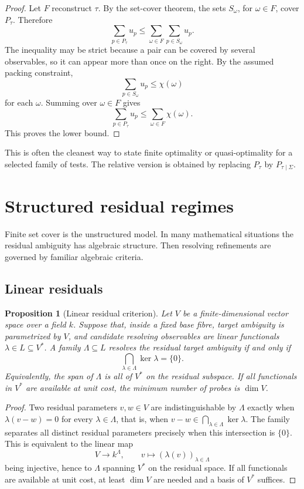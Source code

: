 \documentclass[11pt]{article}
\newtheorem{proposition}[theorem]{Proposition}
\theoremstyle{definition}
\theoremstyle{remark}
\begin{document}
\begin{proof}
Let \(F\) reconstruct \(\tau\).  By the set-cover theorem, the sets \(S_\omega\), for \(\omega\in F\), cover \(P_\tau\).  Therefore
\[
\sum_{p\in P_\tau}u_p
\leq
\sum_{\omega\in F}\sum_{p\in S_\omega}u_p.
\]
The inequality may be strict because a pair can be covered by several observables, so it can appear more than once on the right.  By the assumed packing constraint,
\[
\sum_{p\in S_\omega}u_p\leq \chi(\omega)
\]
for each \(\omega\).  Summing over \(\omega\in F\) gives
\[
\sum_{p\in P_\tau}u_p
\leq
\sum_{\omega\in F}\chi(\omega).
\]
This proves the lower bound.
\end{proof}

This is often the cleanest way to state finite optimality or quasi-optimality for a selected family of tests.  The relative version is obtained by replacing \(P_\tau\) by \(P_{\tau\mid\Sigma}\).

\section{Structured residual regimes}

Finite set cover is the unstructured model.  In many mathematical situations the residual ambiguity has algebraic structure.  Then resolving refinements are governed by familiar algebraic criteria.

\subsection{Linear residuals}

\begin{proposition}[Linear residual criterion]
Let \(V\) be a finite-dimensional vector space over a field \(k\).  Suppose that, inside a fixed base fibre, target ambiguity is parametrized by \(V\), and candidate resolving observables are linear functionals \(\lambda\in L\subseteq V^\ast\).  A family \(\Lambda\subseteq L\) resolves the residual target ambiguity if and only if
\[
\bigcap_{\lambda\in\Lambda}\ker\lambda=\{0\}.
\]
Equivalently, the span of \(\Lambda\) is all of \(V^\ast\) on the residual subspace.  If all functionals in \(V^\ast\) are available at unit cost, the minimum number of probes is \(\dim V\).
\end{proposition}

\begin{proof}
Two residual parameters \(v,w\in V\) are indistinguishable by \(\Lambda\) exactly when \(\lambda(v-w)=0\) for every \(\lambda\in\Lambda\), that is, when \(v-w\in\bigcap_{\lambda\in\Lambda}\ker\lambda\).  The family separates all distinct residual parameters precisely when this intersection is \(\{0\}\).  This is equivalent to the linear map
\[
V\to k^\Lambda,\qquad v\mapsto(\lambda(v))_{\lambda\in\Lambda}
\]
being injective, hence to \(\Lambda\) spanning \(V^\ast\) on the residual space.  If all functionals are available at unit cost, at least \(\dim V\) are needed and a basis of \(V^\ast\) suffices.
\end{proof}
\end{document}
